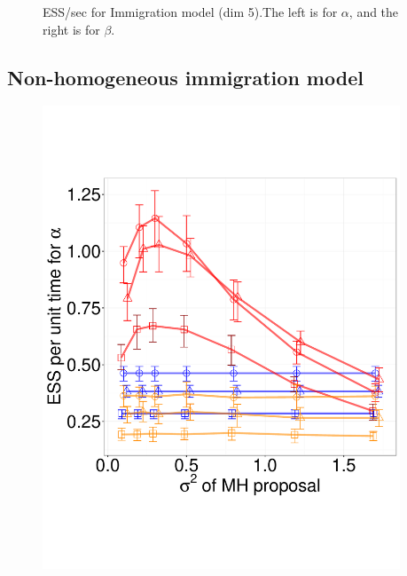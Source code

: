 \begin{figure}[H]
\begin{minipage}[hp]{0.45\linewidth}
    \vspace{-0 in}
      \label{fig:ESS_Q_D5}
  \end{minipage}
    \caption{ESS/sec for Immigration model (dim 5).The left is for $\alpha$, and the right is for $\beta$.}
  \end{figure}

\subsection{Non-homogeneous immigration model}

  \begin{figure}[H]
  \centering
  \begin{minipage}[!hp]{0.45\linewidth}
  \centering
    \includegraphics [width=0.950\textwidth, angle=0]{figs/pc_5_alpha.pdf}
      \end{minipage}
  \begin{minipage}[!hp]{0.45\linewidth}
  \centering

\end{minipage}
\end{figure}
